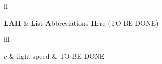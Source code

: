 \documentclass[
12pt, %
english, %
singlespacing, %
liststotoc, %
headsepline, %
]{Thesis_class_mine} %
\begin{document}
\tableofcontents %


\begin{abbreviations}{ll} %

\textbf{LAH} & \textbf{L}ist \textbf{A}bbreviations \textbf{H}ere (TO BE DONE)\\

\end{abbreviations}


%
%
%


\begin{symbols}{lll} %

$c$ & light speed & TO BE DONE \\

\addlinespace %


\end{symbols}

\end{document}
